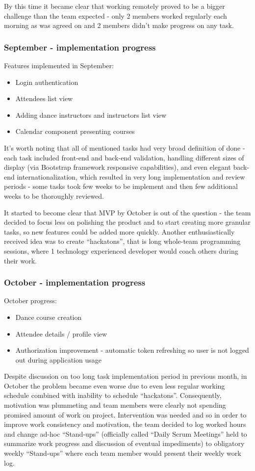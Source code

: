 \documentclass{article}
\begin{document}
By this time it became clear that working remotely proved to be a bigger challenge than the team expected - only 2 members worked regularly each morning as was agreed on and 2 members didn't make progress on any task.

\subsubsection{September - implementation progress}
Features implemented in September:
\begin{itemize}
\item Login authentication
\item Attendees list view
\item Adding dance instructors and instructors list view
\item Calendar component presenting courses
\end{itemize}
It's worth noting that all of mentioned tasks had very broad definition of done - each task included front-end and back-end validation, handling different sizes of display (via Bootstrap framework responsive capabilities), and even elegant back-end internationalization, which resulted in very long implementation and review periods - some tasks took few weeks to be implement and then few additional weeks to be thoroughly reviewed.

It started to become clear that MVP by October is out of the question - the team decided to focus less on polishing the product and to start creating more granular tasks, so new features could be added more quickly. Another enthusiastically received idea was to create ``hackatons'', that is long whole-team programming sessions, where 1 technology experienced developer would coach others during their work.

\subsubsection{October - implementation progress}
October progress:
\begin{itemize}
\item Dance course creation
\item Attendee details / profile view
\item Authorization improvement - automatic token refreshing so user is not logged out during application usage
\end{itemize}

Despite discussion on too long task implementation period in previous month, in October the problem became even worse due to even less regular working schedule combined with inability to schedule ``hackatons''. Consequently, motivation was plummeting and team members were clearly not spending promised amount of work on project. Intervention was needed and so in order to improve work consistency and motivation, the team decided to log worked hours and change ad-hoc ``Stand-ups'' (officially called ``Daily Scrum Meetings'' held to summarize work progress and discussion of eventual impediments) to obligatory weekly ``Stand-ups'' where each team member would present their weekly work log.
\end{document}

